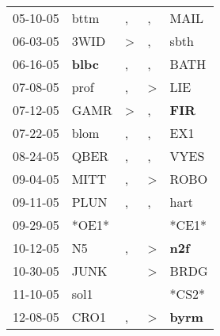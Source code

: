 \begin{supertabular}{p{0.07\textwidth}p{0.06\textwidth}p{0.02\textwidth}p{0.02\textwidth}p{0.06\textwidth}}
          05-10-05\textsuperscript{} &           bttm\textsuperscript{} &                , &                , &           MAIL\textsuperscript{} \\
          06-03-05\textsuperscript{} &           3WID\textsuperscript{} &     \textgreater &                , &           sbth\textsuperscript{} \\
          06-16-05\textsuperscript{} &  \textbf{blbc\textsuperscript{}} &                , &                , &           BATH\textsuperscript{} \\
          07-08-05\textsuperscript{} &           prof\textsuperscript{} &                , &     \textgreater &            LIE\textsuperscript{} \\
          07-12-05\textsuperscript{} &           GAMR\textsuperscript{} &     \textgreater &                , &   \textbf{FIR\textsuperscript{}} \\
          07-22-05\textsuperscript{} &           blom\textsuperscript{} &                , &                , &            EX1\textsuperscript{} \\
          08-24-05\textsuperscript{} &           QBER\textsuperscript{} &                , &                , &           VYES\textsuperscript{} \\
          09-04-05\textsuperscript{} &           MITT\textsuperscript{} &                , &     \textgreater &           ROBO\textsuperscript{} \\
          09-11-05\textsuperscript{} &           PLUN\textsuperscript{} &                , &                , &           hart\textsuperscript{} \\
          09-29-05\textsuperscript{} &                            *OE1* &                  &                  &                            *CE1* \\
          10-12-05\textsuperscript{} &             N5\textsuperscript{} &                , &     \textgreater &   \textbf{n2f\textsuperscript{}} \\
          10-30-05\textsuperscript{} &           JUNK\textsuperscript{} &                  &     \textgreater &           BRDG\textsuperscript{} \\
          11-10-05\textsuperscript{} &           sol1\textsuperscript{} &                  &                  &                            *CS2* \\
          12-08-05\textsuperscript{} &           CRO1\textsuperscript{} &                , &     \textgreater &  \textbf{byrm\textsuperscript{}} \\

\end{supertabular}
